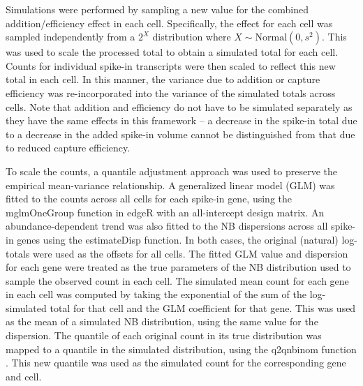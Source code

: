 \documentclass{article}
\begin{document}
Simulations were performed by sampling a new value for the combined addition/efficiency effect in each cell.
Specifically, the effect for each cell was sampled independently from a $2^X$ distribution where $X \sim \mbox{Normal}(0, s^2)$.
This was used to scale the processed total to obtain a simulated total for each cell.
Counts for individual spike-in transcripts were then scaled to reflect this new total in each cell.
In this manner, the variance due to addition or capture efficiency was re-incorporated into the variance of the simulated totals across cells.
Note that addition and efficiency do not have to be simulated separately as they have the same effects in this framework -- a decrease in the spike-in total due to a decrease in the added spike-in volume cannot be distinguished from that due to reduced capture efficiency.

To scale the counts, a quantile adjustment approach was used to preserve the empirical mean-variance relationship.
A generalized linear model (GLM) was fitted to the counts across all cells for each spike-in gene, using the mglmOneGroup function in edgeR \cite{mccarthy2012differential, robinson2010edgeR} with an all-intercept design matrix.
An abundance-dependent trend was also fitted to the NB dispersions across all spike-in genes using the estimateDisp function.
In both cases, the original (natural) log-totals were used as the offsets for all cells.
The fitted GLM value and dispersion for each gene were treated as the true parameters of the NB distribution used to sample the observed count in each cell.
The simulated mean count for each gene in each cell was computed by taking the exponential of the sum of the log-simulated total for that cell and the GLM coefficient for that gene.
This was used as the mean of a simulated NB distribution, using the same value for the dispersion.
The quantile of each original count in its true distribution was mapped to a quantile in the simulated distribution, using the q2qnbinom function \cite{robinson2008small}.
This new quantile was used as the simulated count for the corresponding gene and cell.

\end{document}
